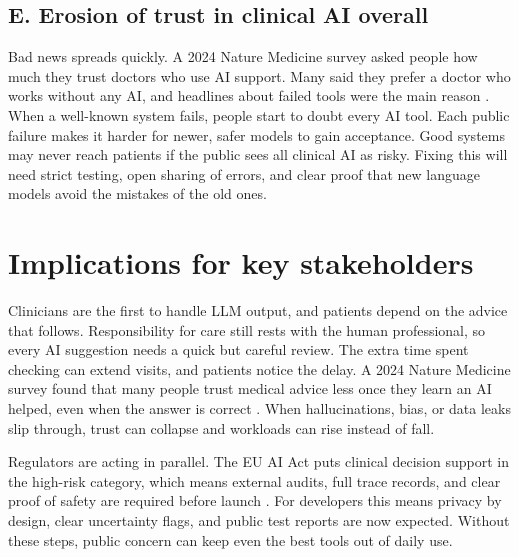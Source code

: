 \documentclass[12pt,a4paper]{scrreprt}
\begin{document}
\subsection*{E. Erosion of trust in clinical AI overall}
Bad news spreads quickly. A 2024 Nature Medicine survey asked people how much they trust doctors who use AI support. Many said they prefer a doctor who works without any AI, and headlines about failed tools were the main reason \autocite{Trust}. When a well-known system fails, people start to doubt every AI tool. Each public failure makes it harder for newer, safer models to gain acceptance. Good systems may never reach patients if the public sees all clinical AI as risky. Fixing this will need strict testing, open sharing of errors, and clear proof that new language models avoid the mistakes of the old ones.


\section*{Implications for key stakeholders}
Clinicians are the first to handle LLM output, and patients depend on the advice that follows. Responsibility for care still rests with the human professional, so every AI suggestion needs a quick but careful review. The extra time spent checking can extend visits, and patients notice the delay. A 2024 Nature Medicine survey found that many people trust medical advice less once they learn an AI helped, even when the answer is correct \autocite{Trust}. When hallucinations, bias, or data leaks slip through, trust can collapse and workloads can rise instead of fall.\par
\vspace{\baselineskip}
\noindent
Regulators are acting in parallel. The EU AI Act puts clinical decision support in the high-risk category, which means external audits, full trace records, and clear proof of safety are required before launch \autocite{EUAIAct}. For developers this means privacy by design, clear uncertainty flags, and public test reports are now expected. Without these steps, public concern can keep even the best tools out of daily use.
\end{document}
